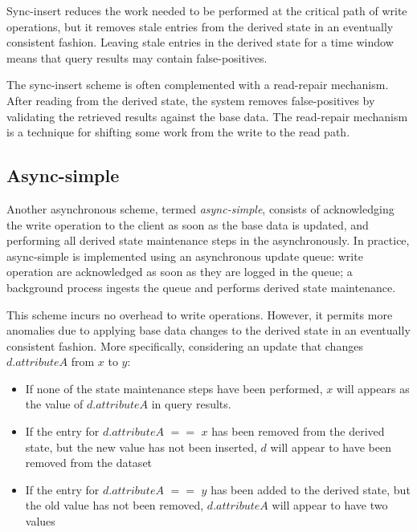 Sync-insert reduces the work needed to be performed at the critical path of write operations,
but it removes stale entries from the derived state in an eventually consistent fashion.
Leaving stale entries in the derived state for a time window means that query results may contain false-positives.

The sync-insert scheme is often complemented with a read-repair mechanism.
After reading from the derived state, the system removes false-positives by validating the retrieved results against
the base data.
The read-repair mechanism is a technique for shifting some work from the write to the read path.

\subsection{Async-simple}
Another asynchronous scheme, termed \textit{async-simple}, consists of acknowledging the write operation to
the client as soon as the base data is updated,
and performing all derived state maintenance steps in the asynchronously.
In practice, async-simple is implemented using an asynchronous update queue:
write operation are acknowledged as soon as they are logged in the queue;
a background process ingests the queue and performs derived state maintenance.

This scheme incurs no overhead to write operations.
However, it permits more anomalies due to applying base data changes to the derived state in an eventually consistent fashion.
More specifically, considering an update that changes $d.attributeA$ from $x$ to $y$:
\begin{itemize}
  \item If none of the state maintenance steps have been performed, $x$ will appears as the value of $d.attributeA$
  in query results.

  \item If the entry for $d.attributeA$ $==$ $x$ has been removed from the derived state, but the new value has not been
  inserted, $d$ will appear to have been removed from the dataset

  \item If the entry for $d.attributeA$ $==$ $y$ has been added to the derived state, but the old value has not been
  removed, $d.attributeA$ will appear to have two values
\end{itemize}



